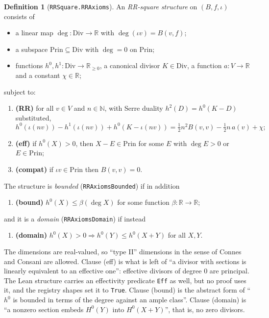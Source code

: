 \documentclass[11pt]{article}
\theoremstyle{definition}
\newtheorem{definition}[theorem]{Definition}
\newcommand{\lean}[1]{\texttt{#1}}
\newcommand{\R}{\mathbb{R}}
\newcommand{\N}{\mathbb{N}}
\newcommand{\Div}{\mathrm{Div}}
\newcommand{\Prin}{\mathrm{Prin}}
\begin{document}
\begin{definition}[\lean{RRSquare.RRAxioms}]\label{def:rr}
An \emph{RR-square structure} on $(B, f, \iota)$ consists of
\begin{itemize}[leftmargin=*]
\item a linear map $\deg : \Div \to \R$ with $\deg(\iota v) = B(v,f)$;
\item a subspace $\Prin \subseteq \Div$ with $\deg = 0$ on $\Prin$;
\item functions $h^0, h^1 : \Div \to \R_{\ge 0}$, a canonical divisor $K \in \Div$, a function $a : V \to \R$ and a constant $\chi\in\R$;
\end{itemize}
subject to:
\begin{enumerate}[label=(\textsc{\roman*}),leftmargin=*]
\item \textbf{(RR)} for all $v\in V$ and $n\in\N$, with Serre duality $h^2(D) = h^0(K-D)$ substituted,
\[
h^0(\iota(nv)) - h^1(\iota(nv)) + h^0(K - \iota(nv)) = \tfrac12 n^2 B(v,v) - \tfrac12 n\, a(v) + \chi ;
\]
\item \textbf{(eff)} if $h^0(X) > 0$, then $X - E \in \Prin$ for some $E$ with $\deg E > 0$ or $E \in \Prin$;
\item \textbf{(compat)} if $\iota v \in \Prin$ then $B(v,v) = 0$.
\end{enumerate}
The structure is \emph{bounded} (\lean{RRAxiomsBounded}) if in addition
\begin{enumerate}[label=(\textsc{\roman*}),leftmargin=*,start=4]
\item \textbf{(bound)} $h^0(X) \le \beta(\deg X)$ for some function $\beta:\R\to\R$;
\end{enumerate}
and it is a \emph{domain} (\lean{RRAxiomsDomain}) if instead
\begin{enumerate}[label=(\textsc{\roman*}$'$),leftmargin=*,start=4]
\item \textbf{(domain)} $h^0(X) > 0 \Rightarrow h^0(Y) \le h^0(X+Y)$ for all $X, Y$.
\end{enumerate}
\end{definition}

The dimensions are real-valued, so ``type II'' dimensions in the sense of Connes and Consani are allowed. Clause (eff) is what is left of ``a divisor with sections is linearly equivalent to an effective one'': effective divisors of degree $0$ are principal. The Lean structure carries an effectivity predicate \lean{Eff} as well, but no proof uses it, and the registry shapes set it to \lean{True}. Clause (bound) is the abstract form of ``$h^0$ is bounded in terms of the degree against an ample class''. Clause (domain) is ``a nonzero section embeds $H^0(Y)$ into $H^0(X+Y)$'', that is, no zero divisors.
\end{document}
